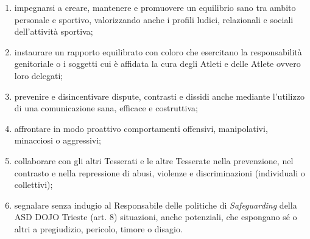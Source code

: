 \documentclass{djtsdoc}
\begin{document}
\begin{enumerate}
\begin{enumerate}
			\item impegnarsi a creare, mantenere e promuovere un equilibrio sano tra ambito personale e 	sportivo, valorizzando anche i profili ludici, relazionali e sociali dell'attività sportiva;
			\item instaurare un rapporto equilibrato con coloro che esercitano la responsabilità genitoriale o i	soggetti cui è affidata la cura degli Atleti e delle Atlete ovvero loro delegati;
			\item prevenire e disincentivare dispute, contrasti e dissidi anche mediante l'utilizzo di una	comunicazione sana, efficace e costruttiva;
			\item affrontare in modo proattivo comportamenti offensivi, manipolativi, minacciosi o aggressivi;
			\item collaborare con gli altri Tesserati e le altre Tesserate nella prevenzione, nel contrasto e nella	repressione di abusi, violenze e discriminazioni (individuali o collettivi);
			\item segnalare senza indugio al Responsabile delle politiche di \textit{Safeguarding} della ASD DOJO Trieste (art. 8) situazioni, anche potenziali, che espongano sé o altri a pregiudizio, pericolo, timore o disagio.
		\end{enumerate}
	\end{enumerate}
	
\end{document}
